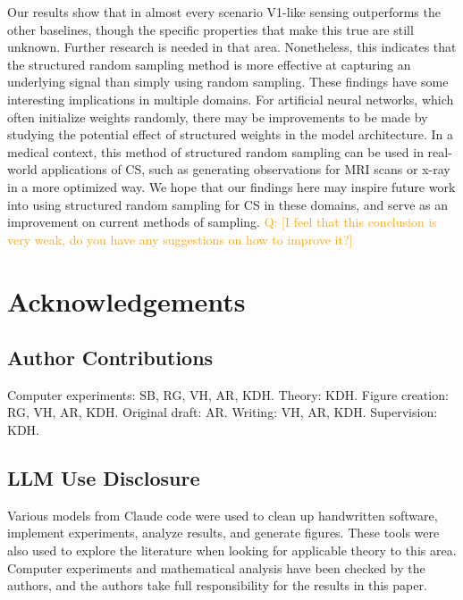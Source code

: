 \documentclass{article}
\newcommand{\question}[1]{\textcolor{orange}{Q: [#1]}}
\begin{document}
Our results show that in almost every scenario V1-like sensing outperforms the other baselines, though the specific properties that make this true are still unknown.
Further research is needed in that area.
Nonetheless, this indicates that the structured random sampling method is more effective at capturing an underlying signal than simply using random sampling.
These findings have some interesting implications in multiple domains.
For artificial neural networks, which often initialize weights randomly, there may be improvements to be made by studying the potential effect of structured weights in the model architecture.
In a medical context, this method of structured random sampling can be used in real-world applications of CS, such as generating observations for MRI scans or x-ray in a more optimized way.
We hope that our findings here may inspire future work into using structured random sampling for CS in these domains, and serve as an improvement on current methods of sampling.
\question{I feel that this conclusion is very weak, do you have any suggestions on how to improve it?}



\newpage
\appendix

\section{Acknowledgements}

\subsection{Author Contributions}
Computer experiments: SB, RG, VH, AR, KDH.
Theory: KDH.
Figure creation: RG, VH, AR, KDH.
Original draft: AR.
Writing: VH, AR, KDH. 
Supervision: KDH.

\subsection{LLM Use Disclosure}

Various models from Claude code were used to clean up handwritten software, implement experiments, analyze results, and generate figures.
These tools were also used to explore the literature when looking for applicable theory to this area.
Computer experiments and mathematical analysis have been checked by the authors, and the authors take full responsibility for the results in this paper.
\end{document}
